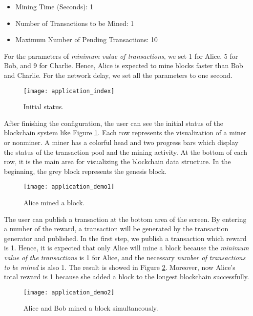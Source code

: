 \begin{itemize}
    \item Mining Time (Seconds): 1
    \item Number of Transactions to be Mined: 1
    \item Maximum Number of Pending Transactions: 10
\end{itemize}

For the parameters of \textit{minimum value of transactions}, we set 1 for Alice, 5 for Bob, and 9 for Charlie. Hence, Alice is expected to mine blocks faster than Bob and Charlie. For the network delay, we set all the parameters to one second.

\begin{figure}[htb]
    \centering
    \texttt{[image: application\_index]}
    \caption{Initial status.}
    \label{fig:initial status}
\end{figure}

After finishing the configuration, the user can see the initial status of the blockchain system like Figure \ref{fig:initial status}. Each row represents the visualization of a miner or nonminer. A miner has a colorful head and two progress bars which display the status of the transaction pool and the mining activity. At the bottom of each row, it is the main area for visualizing the blockchain data structure. In the beginning, the grey block represents the genesis block.

\begin{figure}[htb]
    \centering
    \texttt{[image: application\_demo1]}
    \caption{Alice mined a block.}
    \label{fig:alice mined a block}
\end{figure}

The user can publish a transaction at the bottom area of the screen. By entering a number of the reward, a transaction will be generated by the transaction generator and published. In the first step, we publish a transaction which reward is 1. Hence, it is expected that only Alice will mine a block because the \textit{minimum value of the transactions} is 1 for Alice, and the necessary \textit{number of transactions to be mined} is also 1. The result is showed in Figure \ref{fig:alice mined a block}. Moreover, now Alice's total reward is 1 because she added a block to the longest blockchain successfully.

\begin{figure}[htb]
    \centering
    \texttt{[image: application\_demo2]}
    \caption{Alice and Bob mined a block simultaneously.}
    \label{fig:alice and bob mined a block simultaneously}
\end{figure}

